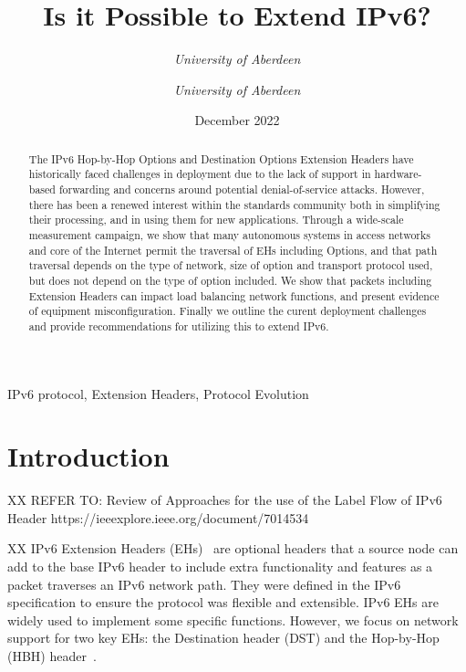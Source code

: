 \documentclass[conference]{IEEEtran}
\title{Is it Possible to Extend IPv6?}
\date{December 2022}
\author{\IEEEauthorblockN{Ana Custura}
\IEEEauthorblockA{
\textit{University of Aberdeen}\\
}
\and
\IEEEauthorblockN{Raffaello Secchi}
\textit{University of Aberdeen}\\
\and
\IEEEauthorblockN{Gorry Fairhurst}
\textit{University of Aberdeen}\\
}
\begin{document}
\maketitle

\begin{abstract}
The IPv6 Hop-by-Hop Options and Destination Options Extension Headers have historically faced challenges in deployment due to the lack of support in hardware-based forwarding and concerns around potential denial-of-service attacks. However, there has been a renewed interest within the standards community both in simplifying their processing, and in using them for new applications. 
Through a wide-scale measurement campaign, we show that many autonomous systems in access networks and core of the Internet permit the traversal of EHs including Options, and that path traversal depends on the type of network, size of option and transport protocol used, but does not depend on the type of option included. We show that packets including Extension Headers can impact load balancing network functions, and present evidence of equipment misconfiguration. Finally we outline the curent deployment challenges  and provide recommendations for utilizing this to extend IPv6.

\end{abstract}

\begin{IEEEkeywords}
IPv6 protocol, Extension Headers, Protocol Evolution
\end{IEEEkeywords}

\section{Introduction}
\label{sec:introduction}

XX 
REFER TO:
Review of Approaches for the use of the Label Flow of IPv6 Header
https://ieeexplore.ieee.org/document/7014534

XX
IPv6 Extension Headers (EHs)~\cite{RFC8200} are optional headers that a source node can
add to the base IPv6 header to include extra functionality and features as a packet traverses an IPv6 network path. They were defined in the IPv6 specification
to ensure the protocol was flexible and extensible.
IPv6 EHs are widely used to implement some specific functions. 
However, we focus on network support for two key EHs: the Destination header (DST) and the Hop-by-Hop (HBH) header~\cite{rfc9098}. 
\end{document}
